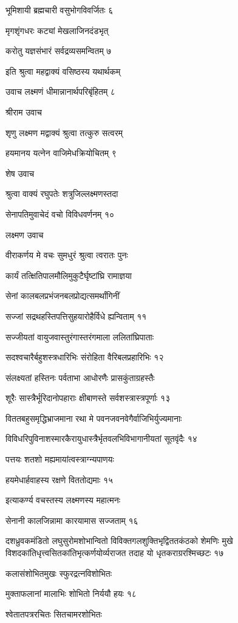 भूमिशायी ब्रह्मचारी वसुभोगविवर्जितः ६

मृगशृंगधरः कट्यां मेखलाजिनदंडभृत्

करोतु यज्ञसंभारं सर्वद्रव्यसमन्वितम् ७

इति श्रुत्वा महद्वाक्यं वसिष्ठस्य यथार्थकम्

उवाच लक्ष्मणं धीमान्नानार्थपरिबृंहितम् ८

श्रीराम उवाच

शृणु लक्ष्मण मद्वाक्यं श्रुत्वा तत्कुरु सत्वरम्

हयमानय यत्नेन वाजिमेधक्रियोचितम् ९

शेष उवाच

श्रुत्वा वाक्यं रघुपतेः शत्रुजिल्लक्ष्मणस्तदा

सेनापतिमुवाचेदं वचो विविधवर्णनम् १०

लक्ष्मण उवाच

वीराकर्णय मे वचः सुमधुरं श्रुत्वा त्वरातः पुनः

कार्यं तत्क्षितिपालमौलिमुकुटैर्घृष्टांघ्रि रामाज्ञया

सेनां कालबलप्रभंजनबलप्रोद्यत्समर्थांगिनीं

सज्जां सद्रथहस्तिपत्तिसुहयारोहैर्विधे ह्यन्विताम् ११

सज्जीयतां वायुजवास्तुरंगास्तरंगमाला ललितांघ्रिपाताः

सदश्वचारैर्बहुशस्त्रधारिभिः संरोहिता वैरिबलप्रहारिभिः १२

संलक्ष्यतां हस्तिनः पर्वताभा आधोरणैः प्रासकुंताग्रहस्तैः

शूरैः सास्त्रैर्भूरिदानोपहाराः क्षीबाणस्ते सर्वशस्त्रास्त्रपूर्णाः १३

विततबहुसमृद्धिभ्राजमाना रथा मे पवनजवनवेगैर्वाजिभिर्युज्यमानाः

विविधरिपुविनाशस्मारकैरायुधास्त्रैर्भृतवलभिविभागानीयतां सूतवृंदैः १४

पत्तयः शतशो मह्यमायांत्वस्त्राग्न्यपाणयः

हयमेधार्हवाहस्य रक्षणे विततोद्यमाः १५

इत्याकर्ण्य वचस्तस्य लक्ष्मणस्य महात्मनः

सेनानी कालजिन्नामा कारयामास सज्जताम् १६

दशध्रुवकमंडितो लघुसुरोमशोभान्वितो विविक्तगलशुक्तिभृद्विततकंठको शेमणिः मुखे
विशदकांतिधृत्त्वसितकांतिभृत्कर्णयोर्व्यराजत तदाह यो धृतकराग्ररश्मिच्छटः १७

कलासंशोभितमुखः स्फुरद्रत्नविशोभितः

मुक्ताफलानां मालाभिः शोभितो निर्ययौ हयः १८

श्वेतातपत्ररचितः सितचामरशोभितः

